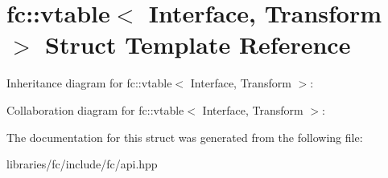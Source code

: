 \hypertarget{structfc_1_1vtable}{}\section{fc\+:\+:vtable$<$ Interface, Transform $>$ Struct Template Reference}
\label{structfc_1_1vtable}


Inheritance diagram for fc\+:\+:vtable$<$ Interface, Transform $>$\+:


Collaboration diagram for fc\+:\+:vtable$<$ Interface, Transform $>$\+:


The documentation for this struct was generated from the following file\+:\begin{DoxyCompactItemize}
\item 
libraries/fc/include/fc/api.\+hpp\end{DoxyCompactItemize}
